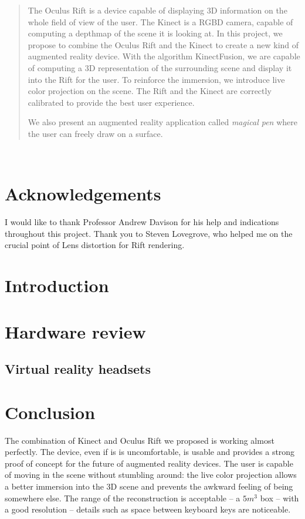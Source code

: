 \documentclass[12pt, twoside]{article}
\let\oldsection\section
\def\section{\cleardoublepage\oldsection}
\begin{document}
\newpage
\begin{abstract}
The Oculus Rift is a device capable of displaying 3D information on the whole field of view of the user. The Kinect is a RGBD camera, capable of computing a depthmap of the scene it is looking at. In this project, we propose to combine the Oculus Rift and the Kinect to create a new kind of augmented reality device. With the algorithm KinectFusion, we are capable of computing a 3D representation of the surrounding scene and display it into the Rift for the user. To reinforce the immersion, we introduce live color projection on the scene. The Rift and the Kinect are correctly calibrated to provide the best user experience.

We also present an augmented reality application called \textit{magical pen} where the user can freely draw on a surface.
\end{abstract}~\\[5cm]

\section*{Acknowledgements}
I would like to thank Professor Andrew Davison for his help and indications throughout this project. Thank you to Steven Lovegrove, who helped me on the crucial point of Lens distortion for Rift rendering.
\newpage

\tableofcontents

\newpage

\section*{Introduction}

\newpage

\section{Hardware review}
\subsection{Virtual reality headsets}

\newpage
\section*{Conclusion}
The combination of Kinect and Oculus Rift we proposed is working almost perfectly. The device, even if is is uncomfortable, is usable and provides a strong proof of concept for the future of augmented reality devices. The user is capable of moving in the scene without stumbling around: the live color projection allows a better immersion into the 3D scene and prevents the awkward feeling of being somewhere else. The range of the reconstruction is acceptable -- a $5m^3$ box -- with a good resolution -- details such as space between keyboard keys are noticeable.
\end{document}

